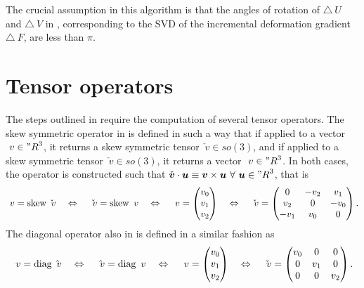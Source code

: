 \documentclass{article}
\newcommand{\svd}{\textsc{SVD}}
\newcommand{\diag}{\op{diag}}
\renewcommand{\skew}{\op{skew}}
\begin{document}
The crucial assumption in this algorithm is that the angles of
rotation of $\triangle ~U$ and $\triangle ~V$ in ,
corresponding to the \svd{} of the incremental deformation gradient
$\triangle ~F$, are less than $\pi$.

\section{Tensor operators}
\label{sec:tensor-operators}

The steps outlined in  require the computation
of several tensor operators. The skew symmetric operator in
 is defined in such a way that if applied to a
vector $~v \in {"R}^3$, it returns a skew symmetric tensor
$\check{~v} \in so(3)$, and if applied to a skew symmetric tensor
$\check{~v} \in so(3)$, it returns a vector $~v \in {"R}^3$. In both
cases, the operator is constructed such that
$\check{\bv} \cdot \bu \equiv \bv \times \bu \ \forall \ \bu \in
{"R}^3$, that is
\begin{equation} \label{eq:skew}
  ~v = \skew \check{~v}
  \quad
  \Leftrightarrow
  \quad
  \check{~v} = \skew ~v
  \quad
  \Leftrightarrow
  \quad
  ~v =
  \begin{pmatrix}
    v_0 \\ v_1 \\ v_2
  \end{pmatrix}
  \quad
  \Leftrightarrow
  \quad
  \check{~v} =
  \begin{pmatrix}
    0 & -v_2 & v_1
    \\
    v_2 & 0 & -v_0
    \\
    -v_1 & v_0 & 0
  \end{pmatrix}.
\end{equation}
The diagonal operator also in  is defined in a
similar fashion as
\begin{equation} \label{eq:diag}
  ~v = \diag \hat{~v}
  \quad
  \Leftrightarrow
  \quad
  \hat{~v} = \diag ~v
  \quad
  \Leftrightarrow
  \quad
  ~v =
  \begin{pmatrix}
    v_0 \\ v_1 \\ v_2
  \end{pmatrix}
  \quad
  \Leftrightarrow
  \quad
  \check{~v} =
  \begin{pmatrix}
    v_0 & 0 & 0
    \\
    0 & v_1 & 0
    \\
    0 & 0 & v_2
  \end{pmatrix}.
\end{equation}
\end{document}
